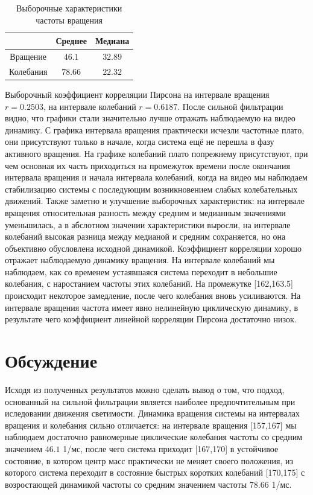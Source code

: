 \documentclass[a4paper,12pt]{article} %
\begin{document}
	\begin{table}[H]
		\caption{Выборочные характеристики частоты вращения}
		\label{tab:my_label4}
		\begin{center}
			\vspace{5mm}
			\begin{tabular}{|c|c|c|}
				\hline
				& Среднее & Медиана\\
				\hline
				Вращение & $ 46.1 $ & $ 32.89 $\\
				\hline
				Колебания & $ 78.66 $ & $ 22.32 $\\
				\hline
			\end{tabular}
		\end{center}
	\end{table}
	
	Выборочный коэффициент корреляции Пирсона на интервале вращения $r = 0.2503$, на интервале колебаний $r = 0.6187$.
	\newline После сильной фильтрации видно, что графики стали значительно лучше отражать наблюдаемую на видео динамику. С графика интервала вращения практически исчезли частотные плато, они присутствуют только в начале, когда система ещё не перешла в фазу активного вращения. На графике колебаний плато попрежнему присутствуют, при чем основная их часть приходиться на промежуток времени после окончания интервала вращения и начала интервала колебаний, когда на видео мы наблюдаем стабилизацию системы с последующим возникновением слабых колебательных движений. 
	\newline Также заметно и улучшение выборочных характеристик: на интервале вращения относительная разность между средним и медианным значениями уменьшилась, а в абслотном значении характеристики выросли, на интервале колебаний высокая разница между медианой и средним сохраняется, но она объективно обусловлена исходной динамикой.
	\newline Коэффициент корреляции хорошо отражает наблюдаемую динамику вращения. На интервале колебаний мы наблюдаем, как со временем устаявшаяся система переходит в небольшие колебания, с наростанием частоты этих колебаний. На промежутке [162,163.5] происходит некоторое замедление, после чего колебания вновь усиливаются. На интервале вращения частота имеет явно нелинейную циклическую динамику, в результате чего коэффициент линейной корреляции Пирсона достаточно низок. 
	\section{Обсуждение}
	Исходя из полученных результатов можно сделать вывод о том, что подход, основанный на сильной фильтрации является наиболее предпочтительным при иследовании движения светимости. 
	\newline Динамика вращения системы на интервалах вращения и колебания сильно отличается: на интервале вращения [157,167] мы наблюдаем достаточно равномерные циклические колебания частоты со средним значением $46.1$ 1/мс, после чего система приходит [167,170] в устойчивое состояние, в котором центр масс практически не меняет своего положения, из которого система переходит в состояние быстрых коротких колебаний [170,175] с возростающей динамикой частоты со средним значением частоты $78.66$ 1/мс.
\end{document}
